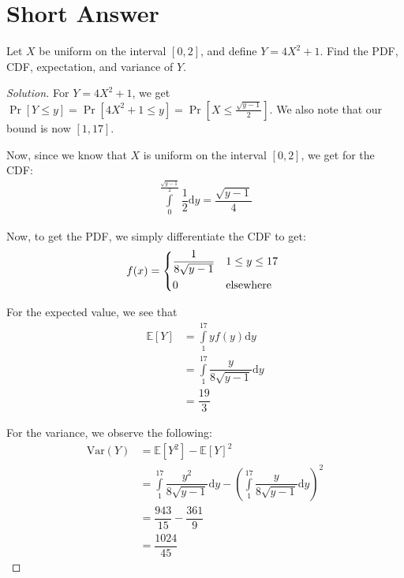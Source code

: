 \documentclass{article}
\newenvironment{solution}{\begin{proof}[Solution]}{\end{proof}}
\newcommand{\newint}[2]{\int\limits_{#1}^{#2}}
\newcommand{\E}{\mathbb{E}}
\newcommand{\Var}{\mathrm{Var}}
\begin{document}
\newpage

\section{Short Answer}
\begin{hw}
	Let $X$ be uniform on the interval $[0,2]$, and define $Y = 4X^2 + 1$. Find the PDF, CDF, expectation, and variance of $Y$.
\end{hw}
\begin{solution}
	For $Y = 4X^{2} + 1$, we get $\Pr[Y \leq y] = \Pr[4X^{2} + 1 \leq y] = \Pr\left[ X \leq \frac{\sqrt{y-1}}{2} \right]$. We also note that our bound is now $\left[ 1, 17 \right]$.
	
	Now, since we know that $X$ is uniform on the interval $\left[ 0, 2 \right]$, we get for the CDF:
	\begin{align*}
		\newint{0}{\frac{\sqrt{y-1}}{2}} \dfrac{1}{2} \mathrm{d}y = \dfrac{\sqrt{y-1}}{4}
	\end{align*}
	
	Now, to get the PDF, we simply differentiate the CDF to get:
	\[
		f(x) =
		\begin{cases*}
			\dfrac{1}{8\sqrt{y-1}} & $1 \leq y \leq 17$ \\
			0 & \text{elsewhere}
		\end{cases*}
	\]
	
	For the expected value, we see that
	\begin{align*}
		\E[Y] &= \newint{1}{17} yf(y) \mathrm{d}y \\
		&= \newint{1}{17} \dfrac{y}{8\sqrt{y-1}} \mathrm{d}y \\
		&= \dfrac{19}{3}
	\end{align*}

	For the variance, we observe the following:
	\begin{align*}
		\Var(Y) &= \E[Y^{2}] - \E[Y]^{2} \\
		&= \newint{1}{17} \dfrac{y^{2}}{8\sqrt{y-1}} \mathrm{d}y - \left( \newint{1}{17} \dfrac{y}{8\sqrt{y-1}} \mathrm{d}y \right)^{2} \\
			&= \dfrac{943}{15} - \dfrac{361}{9} \\
			&= \dfrac{1024}{45}
	\end{align*}
\end{solution}
\end{document}
